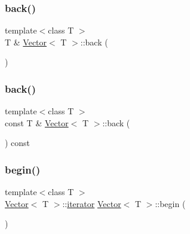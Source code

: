 \mbox{\label{classVector_a6decf0bdeb6849bfcc151b2c514f639f_a6decf0bdeb6849bfcc151b2c514f639f}} 
\subsubsection{\texorpdfstring{back()}{back()}\hspace{0.1cm}{\footnotesize\ttfamily [1/2]}}
{\footnotesize\ttfamily template$<$class T $>$ \\
T \& \hyperlink{classVector}{Vector}$<$ T $>$\+::back (\begin{DoxyParamCaption}{ }\end{DoxyParamCaption})}

\mbox{\label{classVector_ae2094e298cbe0394557b9213942a31d1_ae2094e298cbe0394557b9213942a31d1}} 
\subsubsection{\texorpdfstring{back()}{back()}\hspace{0.1cm}{\footnotesize\ttfamily [2/2]}}
{\footnotesize\ttfamily template$<$class T $>$ \\
const T \& \hyperlink{classVector}{Vector}$<$ T $>$\+::back (\begin{DoxyParamCaption}{ }\end{DoxyParamCaption}) const}

\mbox{\label{classVector_ad1dc835efbf1859b3bd960c9b4f55ad4_ad1dc835efbf1859b3bd960c9b4f55ad4}} 
\subsubsection{\texorpdfstring{begin()}{begin()}\hspace{0.1cm}{\footnotesize\ttfamily [1/2]}}
{\footnotesize\ttfamily template$<$class T $>$ \\
\hyperlink{classVector}{Vector}$<$ T $>$\+::\hyperlink{classVector_1_1iterator}{iterator} \hyperlink{classVector}{Vector}$<$ T $>$\+::begin (\begin{DoxyParamCaption}{ }\end{DoxyParamCaption})}

